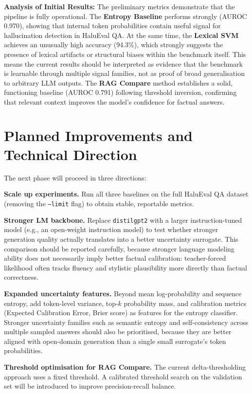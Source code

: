 \documentclass[12pt,a4paper]{article}
\begin{document}
\textbf{Analysis of Initial Results:} 
The preliminary metrics demonstrate that the pipeline is fully operational. The \textbf{Entropy Baseline} performs strongly (AUROC 0.970), showing that internal token probabilities contain useful signal for hallucination detection in HaluEval QA. At the same time, the \textbf{Lexical SVM} achieves an unusually high accuracy (94.3\%), which strongly suggests the presence of lexical artifacts or structural biases within the benchmark itself. This means the current results should be interpreted as evidence that the benchmark is learnable through multiple signal families, not as proof of broad generalisation to arbitrary LLM outputs. The \textbf{RAG Compare} method establishes a solid, functioning baseline (AUROC 0.791) following threshold inversion, confirming that relevant context improves the model's confidence for factual answers.
\section{Planned Improvements and Technical Direction}

The next phase will proceed in three directions:

\textbf{Scale up experiments.} Run all three baselines on the full HaluEval QA dataset (removing the \texttt{--limit} flag) to obtain stable, reportable metrics.

\textbf{Stronger LM backbone.} Replace \texttt{distilgpt2} with a larger instruction-tuned model (e.g., an open-weight instruction model) to test whether stronger generation quality actually translates into a better uncertainty surrogate. This comparison should be reported carefully, because stronger language modeling ability does not necessarily imply better factual calibration: teacher-forced likelihood often tracks fluency and stylistic plausibility more directly than factual correctness.

\textbf{Expanded uncertainty features.} Beyond mean log-probability and sequence entropy, add token-level variance, top-$k$ probability mass, and calibration metrics (Expected Calibration Error, Brier score) as features for the entropy classifier. Stronger uncertainty families such as semantic entropy and self-consistency across multiple sampled answers should also be prioritised, because they are better aligned with open-domain generation than a single small surrogate's token probabilities.

\textbf{Threshold optimisation for RAG Compare.} The current delta-thresholding approach uses a fixed threshold. A calibrated threshold search on the validation set will be introduced to improve precision-recall balance.
\end{document}

